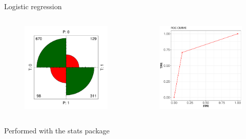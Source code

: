 \documentclass{beamer}
\begin{document}
\begin{frame}{Logistic regression}
\begin{columns}
  \begin{figure}[b]{\textwidth}
    \includegraphics[width=\textwidth]{Pic/Logisic_confusion.pdf}
  \end{figure} 
  \begin{figure}[b]{\textwidth}
    \includegraphics[width=\textwidth]{Pic/ROC_Logistic.pdf}
  \end{figure}
\end{columns}
\begin{center}
Performed with the stats package \cite{stats}
\end{center}
\end{frame}
\end{document}
